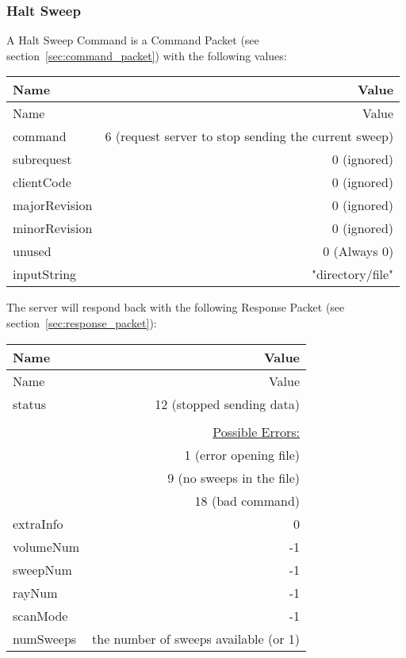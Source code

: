 \documentclass[10pt]{article}
\newcommand{\tblspc}{\rule{0pt}{3ex}}
\begin{document}
\subsubsection{Halt Sweep}
\label{sec:halt_sweep}
A Halt Sweep Command is a Command Packet (see section~\ref{sec:command_packet}) with the following values:
\begin{longtable}{|l|r|}
\hline Name & Value \\ \hline \endfirsthead
\hline Name & Value \\ \hline \endhead
\hline \endfoot
\tblspc command & 6 (request server to stop sending the current sweep) \\
\hline
\tblspc subrequest & 0 (ignored) \\
\hline
\tblspc clientCode & 0 (ignored) \\
\hline
\tblspc majorRevision & 0 (ignored) \\
\hline
\tblspc minorRevision & 0 (ignored) \\
\hline
\tblspc unused & 0 (Always 0) \\
\hline
\tblspc inputString & "directory/file" \\
\hline
\end{longtable}
\newpage

The server will respond back with the following Response Packet (see section~\ref{sec:response_packet}):
\begin{longtable}{|l|r|}
\hline Name & Value \\ \hline \endfirsthead
\hline Name & Value \\ \hline \endhead
\hline \endfoot
\tblspc status & 12 (stopped sending data) \\
& \\
& \underline{Possible Errors:} \\
& 1 (error opening file) \\
& 9 (no sweeps in the file) \\
& 18 (bad command) \\
\hline
\tblspc extraInfo & 0 \\
\hline
\tblspc volumeNum & -1 \\
\hline
\tblspc sweepNum & -1 \\
\hline
\tblspc rayNum & -1 \\
\hline
\tblspc scanMode & -1 \\
\hline
\tblspc numSweeps & the number of sweeps available (or 1) \\
\hline
\end{longtable}
\end{document}
